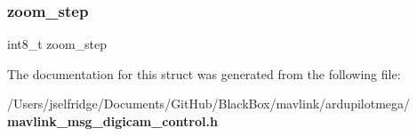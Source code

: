 \mbox{\label{struct____mavlink__digicam__control__t_aef1c7fc4731c93664cf4f48ef901bbca}} 
\subsubsection{zoom\+\_\+step}
{\footnotesize\ttfamily int8\+\_\+t zoom\+\_\+step}



The documentation for this struct was generated from the following file\+:\begin{DoxyCompactItemize}
\item 
/\+Users/jselfridge/\+Documents/\+Git\+Hub/\+Black\+Box/mavlink/ardupilotmega/\textbf{ mavlink\+\_\+msg\+\_\+digicam\+\_\+control.\+h}\end{DoxyCompactItemize}
